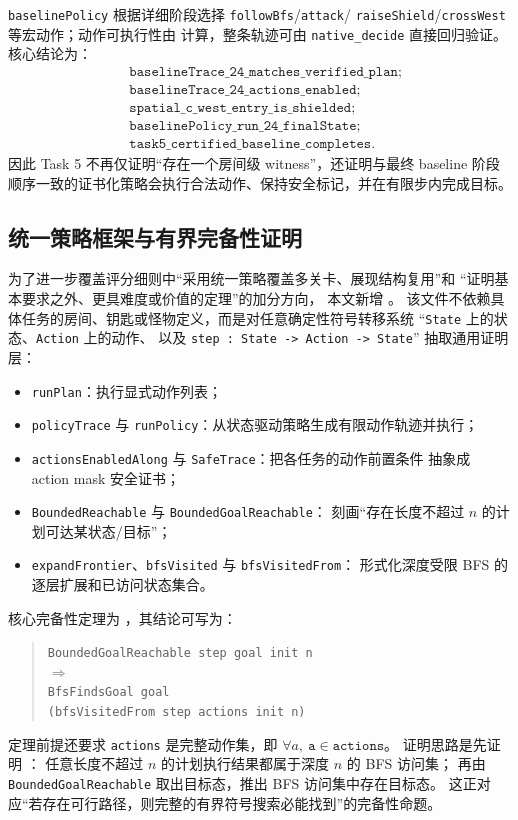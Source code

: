 \documentclass[12pt,a4paper]{ctexart}
\begin{document}
\texttt{baselinePolicy} 根据详细阶段选择 \texttt{followBfs}/\texttt{attack}/
\texttt{raiseShield}/\texttt{crossWest} 等宏动作；动作可执行性由
 计算，整条轨迹可由 \texttt{native\_decide}
直接回归验证。核心结论为：
\[
\begin{aligned}
&\texttt{baselineTrace\_24\_matches\_verified\_plan};\\
&\texttt{baselineTrace\_24\_actions\_enabled};\\
&\texttt{spatial\_c\_west\_entry\_is\_shielded};\\
&\texttt{baselinePolicy\_run\_24\_finalState};\\
&\texttt{task5\_certified\_baseline\_completes}.
\end{aligned}
\]
因此 Task 5 不再仅证明“存在一个房间级 witness”，还证明与最终 baseline
阶段顺序一致的证书化策略会执行合法动作、保持安全标记，并在有限步内完成目标。

\subsection{统一策略框架与有界完备性证明}

为了进一步覆盖评分细则中“采用统一策略覆盖多关卡、展现结构复用”和
“证明基本要求之外、更具难度或价值的定理”的加分方向，
本文新增 。
该文件不依赖具体任务的房间、钥匙或怪物定义，而是对任意确定性符号转移系统
“\texttt{State} 上的状态、\texttt{Action} 上的动作、
以及 \texttt{step : State -> Action -> State}”
抽取通用证明层：

\begin{itemize}[leftmargin=2em]
  \item \texttt{runPlan}：执行显式动作列表；
  \item \texttt{policyTrace} 与 \texttt{runPolicy}：从状态驱动策略生成有限动作轨迹并执行；
  \item \texttt{actionsEnabledAlong} 与 \texttt{SafeTrace}：把各任务的动作前置条件
  抽象成 action mask 安全证书；
  \item \texttt{BoundedReachable} 与 \texttt{BoundedGoalReachable}：
  刻画“存在长度不超过 \(n\) 的计划可达某状态/目标”；
  \item \texttt{expandFrontier}、\texttt{bfsVisited} 与 \texttt{bfsVisitedFrom}：
  形式化深度受限 BFS 的逐层扩展和已访问状态集合。
\end{itemize}

核心完备性定理为 ，其结论可写为：
\begin{quote}
\small
\texttt{BoundedGoalReachable step goal init n}\\
\(\Rightarrow\)\\
\texttt{BfsFindsGoal goal}\\
\texttt{(bfsVisitedFrom step actions init n)}
\end{quote}
定理前提还要求 \texttt{actions} 是完整动作集，即
\(\forall a,\ \texttt{a} \in \texttt{actions}\)。
证明思路是先证明 ：
任意长度不超过 \(n\) 的计划执行结果都属于深度 \(n\) 的 BFS 访问集；
再由 \texttt{BoundedGoalReachable} 取出目标态，推出 BFS 访问集中存在目标态。
这正对应“若存在可行路径，则完整的有界符号搜索必能找到”的完备性命题。
\end{document}
